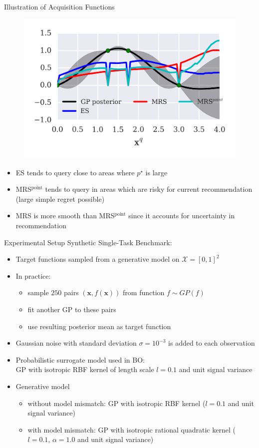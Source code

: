 \documentclass[11pt]{beamer}
\begin{document}
\begin{frame}{Illustration of Acquisition Functions}
\begin{figure}
\centering
\includegraphics[width=0.48\columnwidth]{../pics/acq_comparison_2}
\end{figure}

\vspace*{-.5cm}
\begin{itemize}
\item ES tends to query close to areas where $p^\star$ is large
\item MRS$^\text{point}$ tends to query in areas which are risky for current recommendation (large simple regret possible)
\item MRS is more smooth than MRS$^\text{point}$ since it accounts for uncertainty in recommendation
\end{itemize}

\end{frame}


\begin{frame}{Experimental Setup}
Synthetic Single-Task Benchmark:
\begin{itemize}
 \item Target functions sampled from a generative model on $\mathcal{X} = [0, 1]^2$ 
 \item In practice: 
   \begin{itemize} 
   \item sample $250$ pairs $(\mathbf{x}, f(\mathbf{x}))$ from function $f \sim GP(f)$
   \item fit another GP to these pairs
   \item use resulting posterior mean as target function
   \end{itemize}
 \item Gaussian noise with standard deviation $\sigma =10^{-3}$ is added to each observation
 \item Probabilistic surrogate model used in BO:\\ GP with isotropic RBF kernel of length scale $l = 0.1$ and unit signal variance
 \pause
 \item Generative model
    \begin{itemize} 
    \item without model mismatch: GP with isotropic RBF kernel ($l = 0.1$ and unit signal variance)
    \item with model mismatch:  GP with isotropic rational quadratic kernel ($l = 0.1$, $\alpha=1.0$ and unit signal variance)
    \end{itemize}
\end{itemize}
\end{frame}
\end{document}
